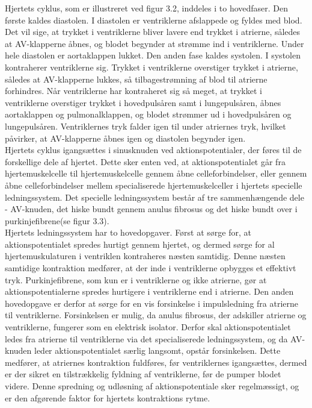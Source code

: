 Hjertets cyklus, som er illustreret ved figur 3.2, inddeles i to hovedfaser. Den første kaldes diastolen. I diastolen er ventriklerne afslappede og fyldes med blod. Det vil sige, at trykket i ventriklerne bliver lavere end trykket i atrierne, således at AV-klapperne åbnes, og blodet begynder at strømme ind i ventriklerne. Under hele diastolen er aortaklappen lukket. Den anden fase kaldes systolen. I systolen kontraherer ventriklerne sig. Trykket i ventriklerne overstiger trykket i atrierne, således at AV-klapperne lukkes, så tilbagestrømning af blod til atrierne forhindres. Når ventriklerne har kontraheret sig så meget, at trykket i ventriklerne overstiger trykket i hovedpulsåren samt i lungepulsåren, åbnes aortaklappen og pulmonalklappen, og blodet strømmer ud i hovedpulsåren og lungepulsåren. Ventriklernes tryk falder igen til under atriernes tryk, hvilket påvirker, at AV-klapperne åbnes igen og diastolen begynder igen.\\
Hjertets cyklus igangsættes i sinusknuden ved aktionspotentialer, der føres til de forskellige dele af hjertet. Dette sker enten ved, at aktionspotentialet går fra hjertemuskelcelle til hjertemuskelcelle gennem åbne celleforbindelser, eller gennem åbne celleforbindelser mellem specialiserede hjertemuskelceller i hjertets specielle ledningssystem. Det specielle ledningssystem består af tre sammenhængende dele - AV-knuden, det hiske bundt gennem anulus fibrosus og det hiske bundt over i purkinjefibrene(se figur 3.3). \\
Hjertets ledningssystem har to hovedopgaver. Først at sørge for, at aktionspotentialet spredes hurtigt gennem hjertet, og dermed sørge for al hjertemuskulaturen i ventriklen kontraheres næsten samtidig. Denne næsten samtidige kontraktion medfører, at der inde i ventriklerne opbygges et effektivt tryk. Purkinjefibrene, som kun er i ventriklerne og ikke atrierne, gør at aktionspotentialerne spredes hurtigere i ventriklerne end i atrierne. Den anden hovedopgave er derfor at sørge for en vis forsinkelse i impulsledning fra atrierne til ventriklerne. Forsinkelsen er mulig, da anulus fibrosus, der adskiller atrierne og ventriklerne, fungerer som en elektrisk isolator. Derfor skal aktionspotentialet ledes fra atrierne til ventriklerne via det specialiserede ledningssystem, og da AV-knuden leder aktionspotentialet særlig langsomt, opstår forsinkelsen. Dette medfører, at atriernes kontraktion fuldføres, før ventriklernes igangsættes, dermed er der sikret en tilstrækkelig fyldning af ventriklerne, før de pumper blodet videre. Denne spredning og udløsning af aktionspotentiale sker regelmæssigt, og er den afgørende faktor for hjertets kontraktions rytme.
